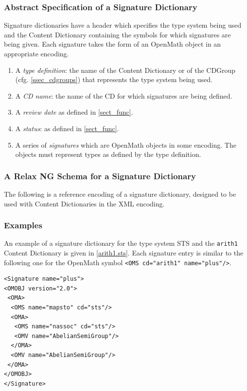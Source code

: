 \documentclass{report}
\def\OM{OpenMath\xspace}
\def\XML{XML\xspace}
\begin{document}
\subsubsection{Abstract Specification  of a Signature Dictionary}\label{sect_sigpcdata}

Signature dictionaries have a header which specifies the type system being used and the
Content Dictionary containing the symbols for which signatures are being given. Each
signature takes the form of an \OM object in an appropriate encoding.

\begin{enumerate}
\item A \emph{type definition}: the name of the Content Dictionary or of the CDGroup
  (cfg. \ref{ssec_cdgroups}) that represents the type system being used.
\item A \emph{CD name}: the name of the CD for which signatures are being defined.
\item A \emph{review date} as defined in \ref{sect_func}.
\item A \emph{status}: as defined in \ref{sect_func}.
\item A series of \emph{signatures} which are \OM objects in some encoding.  The objects
  must represent types as defined by the type definition.
\end{enumerate}

\subsubsection{A Relax NG Schema for a Signature Dictionary}\label{sect_sigschema}

The following is a reference encoding of a signature dictionary,
designed to be used with Content Dictionaries in the \XML encoding.



\subsubsection{Examples}\label{sect_sigex}

An example of a signature dictionary for the type system STS and the \lstinline|arith1|
Content Dictionary is given in \ref{arith1.sts}. Each signature entry is similar to the
following one for the \OM symbol \lstinline|<OMS cd="arith1" name="plus"/>|.

\begin{lstlisting}
<Signature name="plus">
<OMOBJ version="2.0">
 <OMA>
  <OMS name="mapsto" cd="sts"/>
  <OMA>
   <OMS name="nassoc" cd="sts"/> 
   <OMV name="AbelianSemiGroup"/>
  </OMA>
  <OMV name="AbelianSemiGroup"/>
 </OMA>
</OMOBJ>
</Signature>
\end{lstlisting}
\end{document}
